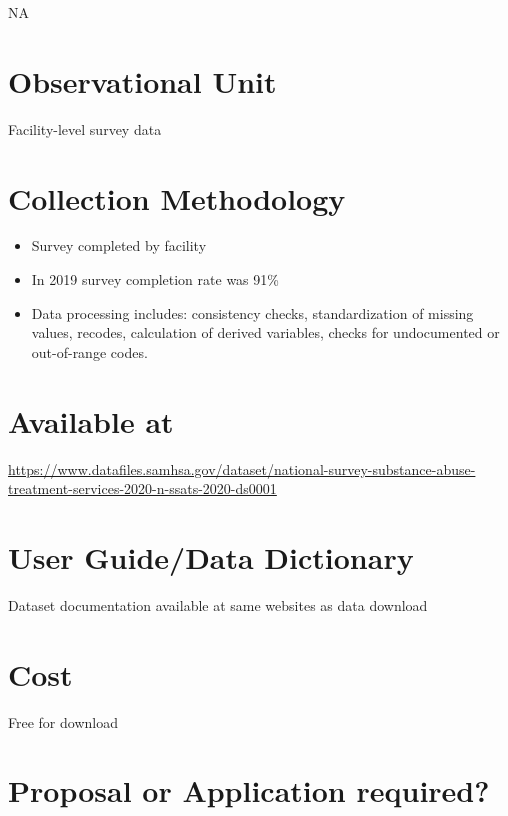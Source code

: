\documentclass[
]{book}
\providecommand{\tightlist}{%
  \setlength{\itemsep}{0pt}\setlength{\parskip}{0pt}}
\begin{document}
NA

\hypertarget{observational-unit-64}{%
\section{Observational Unit}\label{observational-unit-64}}

Facility-level survey data

\hypertarget{collection-methodology-64}{%
\section{Collection Methodology}\label{collection-methodology-64}}

\begin{itemize}
\tightlist
\item
  Survey completed by facility
\item
  In 2019 survey completion rate was 91\%
\item
  Data processing includes: consistency checks, standardization of missing values, recodes, calculation of derived variables, checks for undocumented or out-of-range codes.
\end{itemize}

\hypertarget{available-at-64}{%
\section{Available at}\label{available-at-64}}

\url{https://www.datafiles.samhsa.gov/dataset/national-survey-substance-abuse-treatment-services-2020-n-ssats-2020-ds0001}

\hypertarget{user-guidedata-dictionary-64}{%
\section{User Guide/Data Dictionary}\label{user-guidedata-dictionary-64}}

Dataset documentation available at same websites as data download

\hypertarget{cost-64}{%
\section{Cost}\label{cost-64}}

Free for download

\hypertarget{proposal-or-application-required-64}{%
\section{Proposal or Application required?}\label{proposal-or-application-required-64}}
\end{document}

